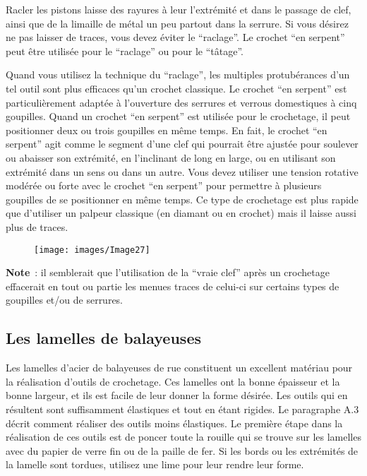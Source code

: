\documentclass[a4paper,french,11pt,twoside]{report}
\begin{document}
Racler les pistons laisse des rayures à leur l'extrémité et dans le passage de clef, ainsi que de la limaille de métal un peu partout dans la serrure. Si vous désirez ne pas laisser de traces, vous devez éviter le \enquote{raclage}. Le crochet \enquote{en serpent} peut être utilisée pour le \enquote{raclage} ou pour le \enquote{tâtage}.

Quand vous utilisez la technique du \enquote{raclage}, les multiples protubérances d'un tel outil sont plus efficaces qu'un crochet classique. Le crochet \enquote{en serpent} est particulièrement adaptée à l'ouverture des serrures et verrous domestiques à cinq goupilles. Quand un crochet \enquote{en serpent} est utilisée pour le crochetage, il peut positionner deux ou trois goupilles en même temps. En fait, le crochet \enquote{en serpent} agit comme le segment d'une clef qui pourrait être ajustée pour soulever ou abaisser son extrémité, en l'inclinant de long en large, ou en utilisant son extrémité dans un sens ou dans un autre. Vous devez utiliser une tension rotative modérée ou forte avec le crochet \enquote{en serpent} pour permettre à plusieurs goupilles de se positionner en même temps. Ce type de crochetage est plus rapide que d'utiliser un palpeur classique (en diamant ou en crochet) mais il laisse aussi plus de traces.

\begin{figure}[ht]
  \begin{center}
    \texttt{[image: images/Image27]}
    \caption{}
\end{center}
\end{figure}

\noindent \textbf{Note}~: il semblerait que l'utilisation de la \enquote{vraie clef} après un crochetage effacerait en tout ou partie les menues traces de celui-ci sur certains types de goupilles et/ou de serrures.

\subsection{Les lamelles de balayeuses}

Les lamelles d'acier de balayeuses de rue constituent un excellent matériau pour la réalisation d'outils de crochetage. Ces lamelles ont la bonne épaisseur et la bonne largeur, et ils est facile de leur donner la forme désirée. Les outils qui en résultent sont suffisamment élastiques et tout en étant rigides. Le paragraphe A.3 décrit comment réaliser des outils moins élastiques. Le première étape dans la réalisation de ces outils est de poncer toute la rouille qui se trouve sur les lamelles avec du papier de verre fin ou de la paille de fer. Si les bords ou les extrémités de la lamelle sont tordues, utilisez une lime pour leur rendre leur forme.
\end{document}

